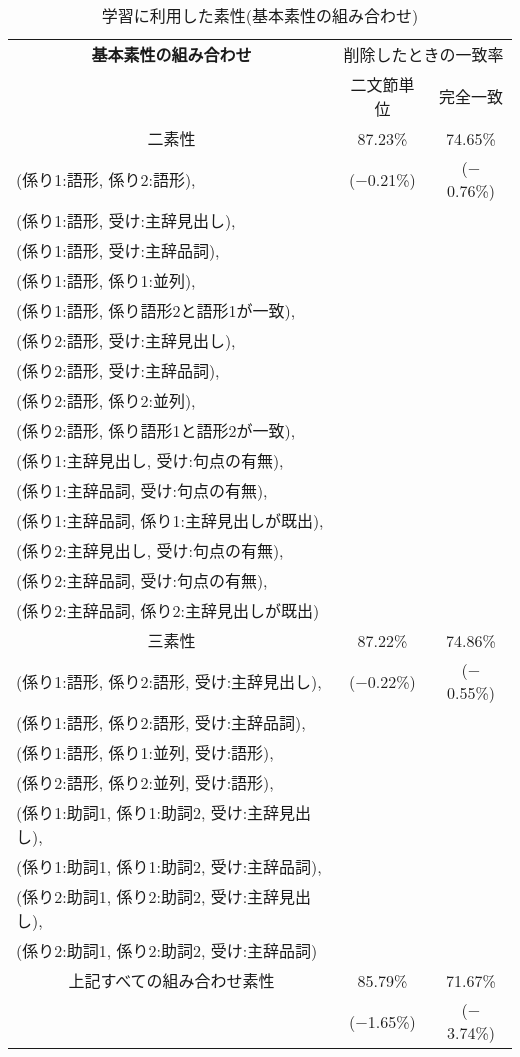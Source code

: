 \begin{table}[htb]
  \begin{center}
    \caption{学習に利用した素性(基本素性の組み合わせ)}
    \label{table:feature2}
    \leavevmode
    \renewcommand{\arraystretch}{}
    \begin{tabular}[c]{|l|c|c|}
      \hline
      \multicolumn{1}{|c|}{\bf 基本素性の組み合わせ} 
      & \multicolumn{2}{|c|}{削除したときの一致率}\\
      \cline{2-3}
      \multicolumn{1}{|c|}{} & 二文節単位 & 完全一致\\
      \hline
      \multicolumn{1}{|c|}{二素性} & 87.23\% & 74.65\% \\
      \cline{1-1}
      (係り1:語形, 係り2:語形), & ($-$0.21\%) & ($-$0.76\%) \\
      (係り1:語形, 受け:主辞見出し), & & \\
      (係り1:語形, 受け:主辞品詞), & & \\
      (係り1:語形, 係り1:並列), & & \\ 
      (係り1:語形, 係り語形2と語形1が一致), & & \\ 
      (係り2:語形, 受け:主辞見出し), & & \\
      (係り2:語形, 受け:主辞品詞), & & \\
      (係り2:語形, 係り2:並列), & & \\ 
      (係り2:語形, 係り語形1と語形2が一致), & & \\
      (係り1:主辞見出し, 受け:句点の有無), & & \\
      (係り1:主辞品詞, 受け:句点の有無), & & \\
      (係り1:主辞品詞, 係り1:主辞見出しが既出), & & \\
      (係り2:主辞見出し, 受け:句点の有無), & & \\
      (係り2:主辞品詞, 受け:句点の有無), & & \\
      (係り2:主辞品詞, 係り2:主辞見出しが既出) & & \\
      \hline
      \multicolumn{1}{|c|}{三素性} & 87.22\% & 74.86\% \\ 
      \cline{1-1}
      (係り1:語形, 係り2:語形, 受け:主辞見出し), 
      & ($-$0.22\%) & ($-$0.55\%) \\
      (係り1:語形, 係り2:語形, 受け:主辞品詞), & & \\
      (係り1:語形, 係り1:並列, 受け:語形), & & \\ 
      (係り2:語形, 係り2:並列, 受け:語形), & & \\ 
      (係り1:助詞1, 係り1:助詞2, 受け:主辞見出し), & & \\
      (係り1:助詞1, 係り1:助詞2, 受け:主辞品詞), & & \\
      (係り2:助詞1, 係り2:助詞2, 受け:主辞見出し), & & \\
      (係り2:助詞1, 係り2:助詞2, 受け:主辞品詞) & & \\
      \hline
      \multicolumn{1}{|c|}{上記すべての組み合わせ素性} 
      & 85.79\% & 71.67\% \\
      & ($-$1.65\%) & ($-$3.74\%) \\
      \hline
    \end{tabular}
  \end{center}
\end{table}

